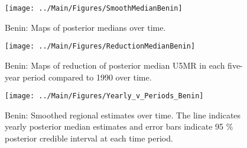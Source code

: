 \documentclass[12pt]{article}\usepackage[]{graphicx}\usepackage[]{color}
\newenvironment{knitrout}{}{} %
\begin{document}
\begin{knitrout}
\color{fgcolor}\begin{figure}[bht]

{\centering \texttt{[image: ../Main/Figures/SmoothMedianBenin]} 

}

\caption[Benin]{Benin: Maps of posterior medians over time.}\label{fig:unnamed-chunk-14}
\end{figure}


\end{knitrout}
\begin{knitrout}
\color{fgcolor}\begin{figure}[bht]

{\centering \texttt{[image: ../Main/Figures/ReductionMedianBenin]} 

}

\caption[Benin]{Benin: Maps of reduction of posterior median U5MR in each five-year period compared to 1990 over time.}\label{fig:unnamed-chunk-15}
\end{figure}


\end{knitrout}
\begin{knitrout}
\color{fgcolor}\begin{figure}[bht]

{\centering \texttt{[image: ../Main/Figures/Yearly\_v\_Periods\_Benin]} 

}

\caption[Benin]{Benin: Smoothed regional estimates over time. The line indicates yearly posterior median estimates and error bars indicate 95 \% posterior credible interval at each time period.}\label{fig:unnamed-chunk-16}
\end{figure}


\end{knitrout}
\end{document}
